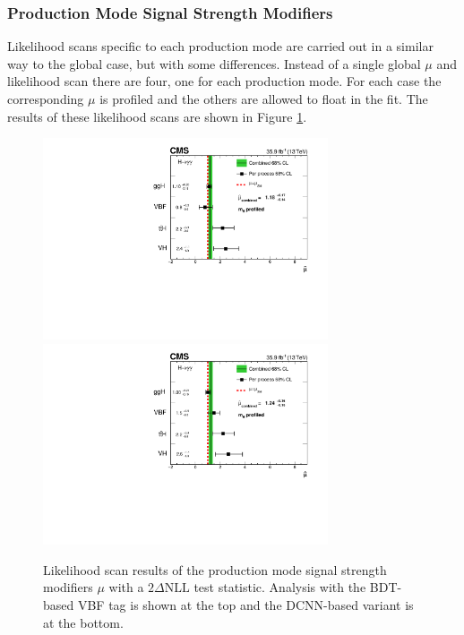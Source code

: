 \subsubsection{Production Mode Signal Strength Modifiers}
Likelihood scans specific to each production mode are carried out in a similar way to the global case, but with some differences. 
Instead of a single global $\mu$ and likelihood scan there are four, one for each production mode. 
For each case the corresponding $\mu$ is profiled and the others are allowed to float in the fit. 
The results of these likelihood scans are shown in Figure \ref{fig:stats_results:prod_mu_scans}. 
\begin{figure}[h!]
    \begin{center}
        \includegraphics[width=0.75\textwidth]{figures/stats_results/CMS-HIG-16-040_Figure_017.pdf}
        \includegraphics[width=0.75\textwidth]{figures/stats_results/PerProcessMuProfileMH.pdf}
    \end{center}
    \caption{Likelihood scan results of the production mode signal strength modifiers $\mu$ with a $2\Delta{\mathrm{NLL}}$ test statistic. Analysis with the BDT-based VBF tag is shown at the top and the DCNN-based variant is at the bottom.}
        \label{fig:stats_results:prod_mu_scans}
\end{figure}

